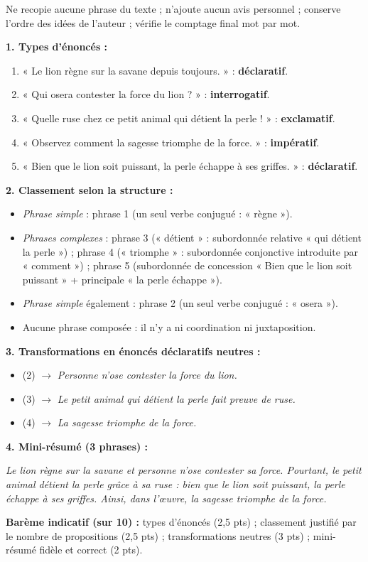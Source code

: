 \documentclass[11pt]{article}
\begin{document}
\begin{attention}
Ne recopie aucune phrase du texte ; n'ajoute aucun avis personnel ; conserve l'ordre des idées de l'auteur ; vérifie le comptage final mot par mot.
\end{attention}

\begin{corrige}
\textbf{1. Types d'énoncés :}
\begin{enumerate}
\item « Le lion règne sur la savane depuis toujours. » : \textbf{déclaratif}.
\item « Qui osera contester la force du lion ? » : \textbf{interrogatif}.
\item « Quelle ruse chez ce petit animal qui détient la perle ! » : \textbf{exclamatif}.
\item « Observez comment la sagesse triomphe de la force. » : \textbf{impératif}.
\item « Bien que le lion soit puissant, la perle échappe à ses griffes. » : \textbf{déclaratif}.
\end{enumerate}

\textbf{2. Classement selon la structure :}
\begin{itemize}
\item \emph{Phrase simple} : phrase 1 (un seul verbe conjugué : « règne »).
\item \emph{Phrases complexes} : phrase 3 (« détient » : subordonnée relative « qui détient la perle ») ; phrase 4 (« triomphe » : subordonnée conjonctive introduite par « comment ») ; phrase 5 (subordonnée de concession « Bien que le lion soit puissant » + principale « la perle échappe »).
\item \emph{Phrase simple} également : phrase 2 (un seul verbe conjugué : « osera »).
\item Aucune phrase composée : il n'y a ni coordination ni juxtaposition.
\end{itemize}

\textbf{3. Transformations en énoncés déclaratifs neutres :}
\begin{itemize}
\item (2) $\rightarrow$ \emph{Personne n'ose contester la force du lion.}
\item (3) $\rightarrow$ \emph{Le petit animal qui détient la perle fait preuve de ruse.}
\item (4) $\rightarrow$ \emph{La sagesse triomphe de la force.}
\end{itemize}

\textbf{4. Mini-résumé (3 phrases) :}

\emph{Le lion règne sur la savane et personne n'ose contester sa force. Pourtant, le petit animal détient la perle grâce à sa ruse : bien que le lion soit puissant, la perle échappe à ses griffes. Ainsi, dans l'œuvre, la sagesse triomphe de la force.}

\textbf{Barème indicatif (sur 10) :} types d'énoncés (2,5 pts) ; classement justifié par le nombre de propositions (2,5 pts) ; transformations neutres (3 pts) ; mini-résumé fidèle et correct (2 pts).
\end{corrige}
\end{document}
